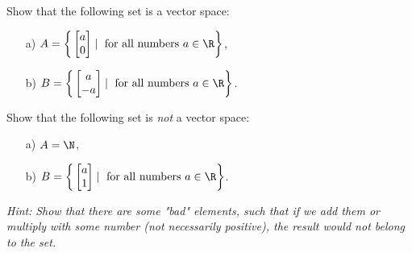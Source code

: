 \medskip

\begin{problem}%
    Show that the following set is a vector space:

    \begin{enumerate}
        \item [a)] $A = \bigg\{ \begin{bmatrix} a \\ 0 \end{bmatrix} \mid \text{ for all numbers }a\in\R\bigg\}$,
        
        \item [b)] $B = \bigg\{ \begin{bmatrix} a \\ -a \end{bmatrix} \mid \text{ for all numbers }a\in\R\bigg\}$.


    \end{enumerate}
    
\end{problem}
\medskip
\begin{problem}%
    Show that the following set is \textit{not} a vector space:

    \begin{enumerate}
        \item [a)] $A = \N$,
        
        \item [b)] $B =  \bigg\{ \begin{bmatrix} a \\ 1 \end{bmatrix} \mid \text{ for all numbers }a\in\R\bigg\}$.
        

    \end{enumerate}
    \bigskip
    {\small \textit{Hint:} \textit{Show that there are some "bad" elements, such that if we add them or multiply with some number (not necessarily positive), the result would not belong to the set.}}
\end{problem}


        
        